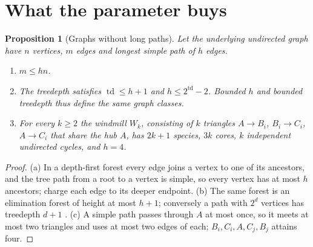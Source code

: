 \documentclass[11pt,a4paper]{article}
\theoremstyle{plain}
\newtheorem{proposition}[theorem]{Proposition}
\theoremstyle{definition}
\theoremstyle{remark}
\newcommand{\td}{\operatorname{td}}
\begin{document}
\section{What the parameter buys}\label{sec:parameter}

\begin{proposition}[Graphs without long paths]\label{prop:graphs}
Let the underlying undirected graph have $n$ vertices, $m$ edges and longest simple path of $h$ edges.
\begin{enumerate}[label=(\alph*)]
\item $m\le hn$.
\item The treedepth satisfies $\td\le h+1$ and $h\le2^{\td}-2$. Bounded $h$ and bounded treedepth thus define the same graph classes.
\item For every $k\ge2$ the \emph{windmill} $W_k$, consisting of $k$ triangles $A\to B_i$, $B_i\to C_i$, $A\to C_i$ that share the hub $A$, has $2k+1$ species, $3k$ cores, $k$ independent undirected cycles, and $h=4$.
\end{enumerate}
\end{proposition}
\begin{proof}
(a) In a depth-first forest every edge joins a vertex to one of its ancestors, and the tree path from a root to a vertex is simple, so every vertex has at most $h$ ancestors; charge each edge to its deeper endpoint. (b) The same forest is an elimination forest of height at most $h+1$; conversely a path with $2^{d}$ vertices has treedepth $d+1$ \citep[Chapter 6]{nesetril2012}. (c) A simple path passes through $A$ at most once, so it meets at most two triangles and uses at most two edges of each; $B_i,C_i,A,C_j,B_j$ attains four.
\end{proof}
\end{document}

